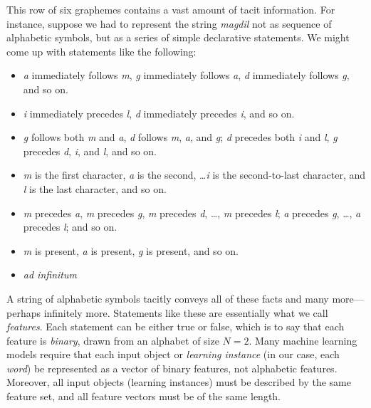 This row of six graphemes contains a vast amount of tacit information. For instance, suppose we had to represent the string \textit{magdil} not as sequence of alphabetic symbols, but as a series of simple declarative statements. We might come up with statements like the following: 
\begin{itemize}
  \item \textit{a} immediately follows \textit{m}, \textit{g} immediately follows \textit{a}, \textit{d} immediately follows \textit{g}, and so on. 
  \item \textit{i} immediately precedes \textit{l}, \textit{d} immediately precedes \textit{i}, and so on.
     \item \textit{g} follows both \textit{m} and \textit{a}, \textit{d} follows \textit{m}, \textit{a}, and 
   \textit{g}; \textit{d} precedes both \textit{i} and \textit{l}, \textit{g} precedes \textit{d}, \textit{i}, and \textit{l}, and so on.
   \item \textit{m} is the first character, \textit{a} is the second, \dots \textit{i} is the second-to-last character, and \textit{l} is the last character, and so on.
   \item \textit{m} precedes \textit{a}, \textit{m} precedes \textit{g}, \textit{m} precedes \textit{d}, \dots, \textit{m} precedes \textit{l}; \textit{a} precedes \textit{g}, \dots , \textit{a} precedes \textit{l}; and so on.
   \item \textit{m} is present, \textit{a} is present, \textit{g} is present, and so on.
   \item \emph{ad infinitum}
\end{itemize}
A string of alphabetic symbols tacitly conveys all of these facts and many more---perhaps infinitely more.
Statements like these are essentially what we call \emph{features}.
Each statement can be either true or false, which is to say that each feature is \emph{binary}, drawn from an alphabet of size $N = 2$.  
Many machine learning models require that each input object or \emph{learning instance} (in our case, each \emph{word}) be represented as a vector of binary features, not alphabetic features. Moreover, all input objects (learning instances) must be described by the same feature set, and all feature vectors must be of the same length.


